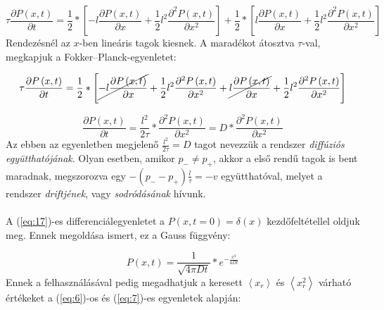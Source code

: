 \begin{equation} \label{eq:15}
    \tau \frac{\partial P \left( x, t \right)}{\partial t}
    =
    \frac{1}{2} * \left[ -l \frac{\partial P \left( x, t \right)}{\partial x} + \frac{1}{2} l^{2} \frac{\partial^{2} P \left( x, t \right)}{\partial x^{2}} \right] + \frac{1}{2} * \left[ l \frac{\partial P \left( x, t \right)}{\partial x} + \frac{1}{2} l^{2} \frac{\partial^{2} P \left( x, t \right)}{\partial x^{2}} \right]
\end{equation}
Rendezésnél az $x$-ben lineáris tagok kiesnek. A maradékot átosztva $\tau$-val, megkapjuk a Fokker--Planck-egyenletet:

\begin{equation} \label{eq:16}
    \tau \frac{\partial P \left( x, t \right)}{\partial t}
    =
    \frac{1}{2} * \left[ \cancel{-l \frac{\partial P \left( x, t \right)}{\partial x}} + \frac{1}{2} l^{2} \frac{\partial^{2} P \left( x, t \right)}{\partial x^{2}} + \cancel{l \frac{\partial P \left( x, t \right)}{\partial x}} + \frac{1}{2} l^{2} \frac{\partial^{2} P \left( x, t \right)}{\partial x^{2}} \right]
\end{equation}

\begin{equation} \label{eq:17}
    \frac{\partial P \left( x, t \right)}{\partial t} 
    =
    \frac{l^{2}}{2 \tau} * \frac{\partial^{2} P \left( x, t \right)}{\partial x^{2}}
    =
    D * \frac{\partial^{2} P \left( x, t \right)}{\partial x^{2}}
\end{equation}
Az ebben az egyenletben megjelenő $\frac{l^{2}}{2 \tau} = D$ tagot nevezzük a rendszer \emph{diffúziós együtthatójának}. Olyan esetben, amikor $p_{-} \neq p_{+}$, akkor a első rendű tagok is bent maradnak, megszorozva egy $- \left( p_{-} - p_{+} \right) \frac{l}{\tau} = - v$ együtthatóval, melyet a rendszer \emph{driftjének}, vagy \emph{sodródásának} hívunk.
\\ \\
A (\ref{eq:17})-es differenciálegyenletet a $P \left( x, t=0 \right) = \delta \left( x \right)$ kezdőfeltétellel oldjuk meg. Ennek megoldása ismert, ez a Gauss függvény:

\begin{equation} \label{eq:18}
    P \left( x, t \right) = \frac{1}{\sqrt{4 \pi D t}} * e^{-\tfrac{x^{2}}{4Dt}}
\end{equation}
Ennek a felhasználásával pedig megadhatjuk a keresett $\left< x_{r} \right>$ és $\left< x_{r}^{2} \right>$ várható értékeket a (\ref{eq:6})-os és (\ref{eq:7})-es egyenletek alapján:

